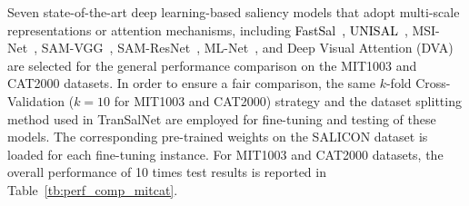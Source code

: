 \documentclass{article}
\begin{document}
Seven state-of-the-art deep learning-based saliency models that adopt multi-scale representations or attention mechanisms, including \textcolor{black}{FastSal~\cite{FastSal}, UNISAL~\cite{UNISAL}}, MSI-Net~\cite{MSI-Net}, SAM-VGG~\cite{SAM_Cornia}, SAM-ResNet~\cite{SAM_Cornia}, ML-Net~\cite{ML-Net}, and Deep Visual Attention (DVA)~\cite{DVA_Wang} are selected for the general performance comparison on the MIT1003 and CAT2000 datasets. In order to ensure a fair comparison, the same $k$-fold Cross-Validation ($k=10$ for MIT1003 and CAT2000) strategy and the dataset splitting method used in TranSalNet are employed for fine-tuning and testing of these models. The corresponding pre-trained weights on the SALICON dataset is loaded for each fine-tuning instance. For MIT1003 and CAT2000 datasets, the overall performance of 10 times test results is reported in Table~\ref{tb:perf_comp_mitcat}.
\end{document}
